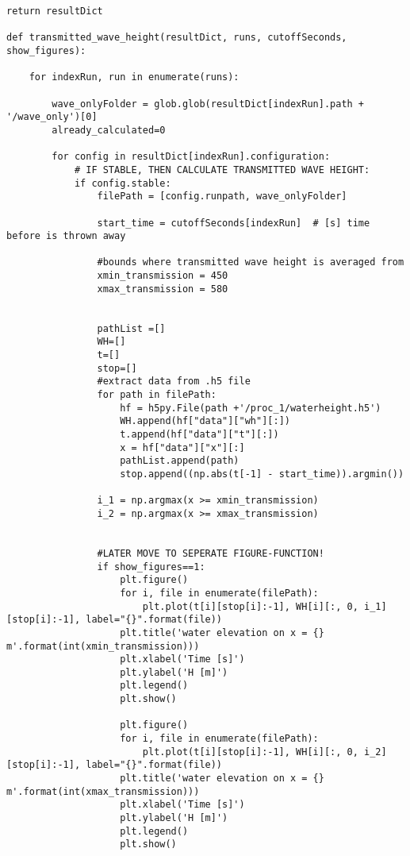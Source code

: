\begin{mdframed}[backgroundcolor=light-gray, roundcorner=10pt,leftmargin=1, rightmargin=1, innerleftmargin=0, innertopmargin=7,innerbottommargin=0, outerlinewidth=1, linecolor=light-gray]
\begin{lstlisting}[linewidth=\columnwidth,caption=Functions used in post-processing ., label=script: post processing functions]
    return resultDict

def transmitted_wave_height(resultDict, runs, cutoffSeconds, show_figures):

    for indexRun, run in enumerate(runs):

        wave_onlyFolder = glob.glob(resultDict[indexRun].path + '/wave_only')[0]
        already_calculated=0

        for config in resultDict[indexRun].configuration:
            # IF STABLE, THEN CALCULATE TRANSMITTED WAVE HEIGHT:
            if config.stable:
                filePath = [config.runpath, wave_onlyFolder]

                start_time = cutoffSeconds[indexRun]  # [s] time before is thrown away

                #bounds where transmitted wave height is averaged from
                xmin_transmission = 450
                xmax_transmission = 580


                pathList =[]
                WH=[]
                t=[]
                stop=[]
                #extract data from .h5 file
                for path in filePath:
                    hf = h5py.File(path +'/proc_1/waterheight.h5')
                    WH.append(hf["data"]["wh"][:])
                    t.append(hf["data"]["t"][:])
                    x = hf["data"]["x"][:]
                    pathList.append(path)
                    stop.append((np.abs(t[-1] - start_time)).argmin())

                i_1 = np.argmax(x >= xmin_transmission)
                i_2 = np.argmax(x >= xmax_transmission)


                #LATER MOVE TO SEPERATE FIGURE-FUNCTION!
                if show_figures==1:
                    plt.figure()
                    for i, file in enumerate(filePath):
                        plt.plot(t[i][stop[i]:-1], WH[i][:, 0, i_1][stop[i]:-1], label="{}".format(file))
                    plt.title('water elevation on x = {} m'.format(int(xmin_transmission)))
                    plt.xlabel('Time [s]')
                    plt.ylabel('H [m]')
                    plt.legend()
                    plt.show()

                    plt.figure()
                    for i, file in enumerate(filePath):
                        plt.plot(t[i][stop[i]:-1], WH[i][:, 0, i_2][stop[i]:-1], label="{}".format(file))
                    plt.title('water elevation on x = {} m'.format(int(xmax_transmission)))
                    plt.xlabel('Time [s]')
                    plt.ylabel('H [m]')
                    plt.legend()
                    plt.show()



\end{lstlisting}
\end{mdframed}
